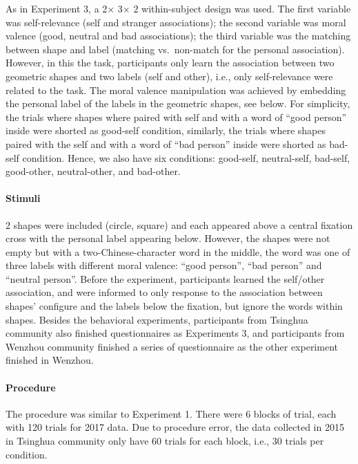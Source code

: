 \documentclass[
  english,
  man]{apa6}
\let\oldparagraph\paragraph
\renewcommand{\paragraph}[1]{\oldparagraph{#1}\mbox{}}
\begin{document}
As in Experiment 3, a 2× 3× 2 within-subject design was used. The first variable was self-relevance (self and stranger associations); the second variable was moral valence (good, neutral and bad associations); the third variable was the matching between shape and label (matching vs.~non-match for the personal association).
However, in this the task, participants only learn the association between two geometric shapes and two labels (self and other), i.e., only self-relevance were related to the task. The moral valence manipulation was achieved by embedding the personal label of the labels in the geometric shapes, see below. For simplicity, the trials where shapes where paired with self and with a word of \enquote{good person} inside were shorted as good-self condition, similarly, the trials where shapes paired with the self and with a word of \enquote{bad person} inside were shorted as bad-self condition. Hence, we also have six conditions: good-self, neutral-self, bad-self, good-other, neutral-other, and bad-other.

\hypertarget{stimuli-5}{%
\paragraph{Stimuli}\label{stimuli-5}}

2 shapes were included (circle, square) and each appeared above a central fixation cross with the personal label appearing below. However, the shapes were not empty but with a two-Chinese-character word in the middle, the word was one of three labels with different moral valence: \enquote{good person}, \enquote{bad person} and \enquote{neutral person}. Before the experiment, participants learned the self/other association, and were informed to only response to the association between shapes' configure and the labels below the fixation, but ignore the words within shapes. Besides the behavioral experiments, participants from Tsinghua community also finished questionnaires as Experiments 3, and participants from Wenzhou community finished a series of questionnaire as the other experiment finished in Wenzhou.

\hypertarget{procedure-9}{%
\paragraph{Procedure}\label{procedure-9}}

The procedure was similar to Experiment 1. There were 6 blocks of trial, each with 120 trials for 2017 data. Due to procedure error, the data collected in 2015 in Tsinghua community only have 60 trials for each block, i.e., 30 trials per condition.
\end{document}
